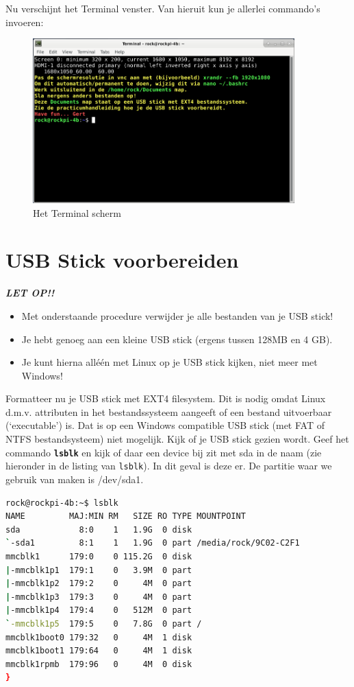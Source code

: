 Nu verschijnt het Terminal venster. Van hieruit kun je allerlei commando's invoeren:
\begin{figure}[h!]
	\centering
	\begin{center} 
		\includegraphics[width=0.9\textwidth]{figuren/terminal-inlogscherm}	
		\caption{Het Terminal scherm}
		\label{fig:terminal-inlogscherm}   
	\end{center}
\end{figure}

\section{USB Stick voorbereiden}
\textbf{\textit{LET OP!! }}
\begin{itemize}
	\item Met onderstaande procedure verwijder je alle bestanden van je USB stick!
	\item Je hebt genoeg aan een kleine USB stick (ergens tussen 128MB en 4 GB).
	\item Je kunt hierna alléén met Linux op je USB stick kijken, niet meer met Windows!
\end{itemize}

Formatteer nu je USB stick met EXT4 filesystem. Dit is nodig omdat Linux d.m.v. attributen in het bestandssysteem aangeeft of een bestand uitvoerbaar (‘executable’) is. Dat is op  een Windows compatible USB stick (met FAT of NTFS bestandsysteem) niet mogelijk.
Kijk of je USB stick gezien wordt. Geef het commando \textbf{\texttt{lsblk}} en kijk of daar een device bij zit met sda in de naam (zie hieronder in de listing van \texttt{lsblk}). In dit geval is deze er. De partitie waar we gebruik van maken is /dev/sda1.

\begin{lstlisting}[language=bash]
rock@rockpi-4b:~$ lsblk
NAME         MAJ:MIN RM   SIZE RO TYPE MOUNTPOINT
sda            8:0    1   1.9G  0 disk
`-sda1         8:1    1   1.9G  0 part /media/rock/9C02-C2F1
mmcblk1      179:0    0 115.2G  0 disk
|-mmcblk1p1  179:1    0   3.9M  0 part
|-mmcblk1p2  179:2    0     4M  0 part
|-mmcblk1p3  179:3    0     4M  0 part
|-mmcblk1p4  179:4    0   512M  0 part
`-mmcblk1p5  179:5    0   7.8G  0 part /
mmcblk1boot0 179:32   0     4M  1 disk
mmcblk1boot1 179:64   0     4M  1 disk
mmcblk1rpmb  179:96   0     4M  0 disk
}
\end{lstlisting}
	
